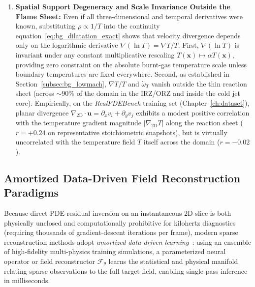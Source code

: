 \begin{enumerate}
    \item \textbf{Spatial Support Degeneracy and Scale Invariance Outside the Flame Sheet:} Even if all three-dimensional and temporal derivatives were known, substituting $\rho \propto 1/T$ into the continuity equation~\eqref{eq:bg_dilatation_exact} shows that velocity divergence depends only on the logarithmic derivative $\nabla (\ln T) = \nabla T / T$. First, $\nabla (\ln T)$ is invariant under any constant multiplicative rescaling $T(\mathbf{x}) \mapsto \alpha T(\mathbf{x})$, providing zero constraint on the absolute burnt-gas temperature scale unless boundary temperatures are fixed everywhere. Second, as established in Section~\ref{subsec:bg_lowmach}, $\nabla T / T$ and $\dot{\omega}_T$ vanish outside the thin reaction sheet (across $\sim 90\%$ of the domain in the IRZ/ORZ and inside the cold jet core). Empirically, on the \textit{RealPDEBench} training set (Chapter~\ref{ch:dataset}), planar divergence $\nabla_{\text{2D}} \cdot \mathbf{u} = \partial_x v_i + \partial_y v_j$ exhibits a modest positive correlation with the temperature gradient magnitude $|\nabla_{\text{2D}} T|$ along the reaction sheet ($r = +0.24$ on representative stoichiometric snapshots), but is virtually uncorrelated with the temperature field $T$ itself across the domain ($r = -0.02$).
\end{enumerate}

\subsection{Amortized Data-Driven Field Reconstruction Paradigms}
\label{subsec:bg_datadriven_paradigms}

Because direct PDE-residual inversion on an instantaneous 2D slice is both physically unclosed and computationally prohibitive for kilohertz diagnostics (requiring thousands of gradient-descent iterations per frame), modern sparse reconstruction methods adopt \emph{amortized data-driven learning}~\cite{deng2025sciml, wang2024reacting, wang2026ammonia}: using an ensemble of high-fidelity multi-physics training simulations, a parameterized neural operator or field reconstructor $\mathcal{F}_\theta$ learns the statistical and physical manifold relating sparse observations to the full target field, enabling single-pass inference in milliseconds.

